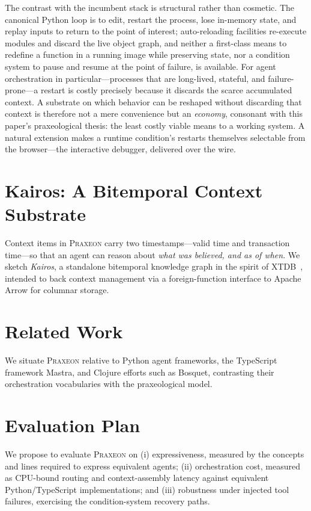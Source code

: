 \documentclass[11pt,a4paper]{article}
\begin{document}
The contrast with the incumbent stack is structural rather than cosmetic. The
canonical Python loop is to edit, restart the process, lose in-memory state, and
replay inputs to return to the point of interest; auto-reloading facilities
re-execute modules and discard the live object graph, and neither a first-class
means to redefine a function in a running image while preserving state, nor a
condition system to pause and resume at the point of failure, is available. For
agent orchestration in particular---processes that are long-lived, stateful, and
failure-prone---a restart is costly precisely because it discards the scarce
accumulated context. A substrate on which behavior can be reshaped without
discarding that context is therefore not a mere convenience but an \emph{economy},
consonant with this paper's praxeological thesis: the least costly viable means to
a working system. A natural extension makes a runtime condition's restarts
themselves selectable from the browser---the interactive debugger, delivered over
the wire.

\section{Kairos: A Bitemporal Context Substrate}
\label{sec:kairos}
Context items in \textsc{Praxeon} carry two timestamps---valid time and
transaction time---so that an agent can reason about \emph{what was believed, and
as of when}. We sketch \emph{Kairos}, a standalone bitemporal knowledge graph in
the spirit of XTDB~\citep{xtdb}, intended to back context management via a
foreign-function interface to Apache Arrow for columnar storage.

\section{Related Work}
\label{sec:related}
We situate \textsc{Praxeon} relative to Python agent frameworks, the TypeScript
framework Mastra, and Clojure efforts such as Bosquet, contrasting their
orchestration vocabularies with the praxeological model.

\section{Evaluation Plan}
\label{sec:eval}
We propose to evaluate \textsc{Praxeon} on (i) expressiveness, measured by the
concepts and lines required to express equivalent agents; (ii) orchestration
cost, measured as CPU-bound routing and context-assembly latency against
equivalent Python/TypeScript implementations; and (iii) robustness under
injected tool failures, exercising the condition-system recovery paths.
\end{document}
